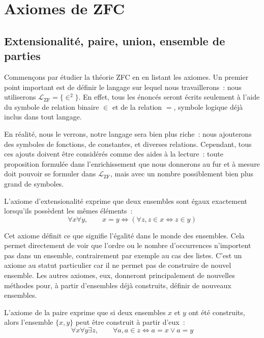 \section{Axiomes de ZFC}

\subsection[Premiers axiomes]{Extensionalité, paire, union, ensemble de parties}

Commençons par étudier la théorie ZFC en en listant les axiomes. Un premier
point important est de définir le langage sur lequel nous travaillerons~: nous
utiliserons $\mathcal L_{\mathrm{ZF}} = \{ \in^2\}$. En effet, tous les énoncés
seront écrits seulement à l'aide du symbole de relation binaire $\in$ et de la
relation $=$, symbole logique déjà inclus dans tout langage.

\begin{remark}
  En réalité, nous le verrons, notre langage sera bien plus riche~: nous
  ajouterons des symboles de fonctions, de constantes, et diverses relations.
  Cependant, tous ces ajouts doivent être considérés comme des aides à la
  lecture~: toute proposition formulée dans l'enrichissement que nous donnerons
  au fur et à mesure doit pouvoir se formuler dans $\mathcal L_{\mathrm{ZF}}$,
  mais avec un nombre possiblement bien plus grand de symboles.
\end{remark}

\begin{axiom}[Extensionalité]\label{ax.ZF.ext}
  L'axiome d'extensionalité exprime que deux ensembles sont égaux exactement
  lorsqu'ils possèdent les mêmes éléments~:
  \[\forall x \forall y, \qquad x = y \iff (\forall z, z \in x\iff z \in y)\]
\end{axiom}

Cet axiome définit ce que signifie l'égalité dans le monde des ensembles. Cela
permet directement de voir que l'ordre ou le nombre d'occurrences n'importent
pas dans un ensemble, contrairement par exemple au cas des listes. C'est un
axiome au statut particulier car il ne permet pas de construire de nouvel
ensemble. Les autres axiomes, eux, donneront principalement de nouvelles
méthodes pour, à partir d'ensembles déjà construits, définir de nouveaux
ensembles.

\begin{axiom}[Paire]\label{ax.ZF.pair}
  L'axiome de la paire exprime que si deux ensembles $x$ et $y$ ont été
  construits, alors l'ensemble $\{x,y\}$ peut être construit à partir d'eux~:
  \[\forall x \forall y \exists z, \qquad \forall a, a \in z \iff
  a = x \lor a = y\]
\end{axiom}

